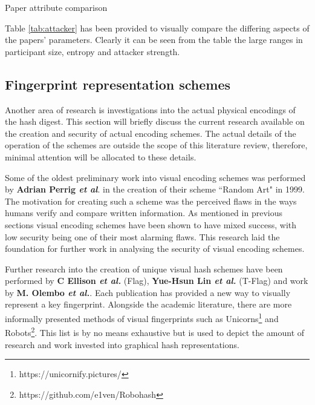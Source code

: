 \begin{table}[h!]
    \makebox[\textwidth][c]{
        
    }%
    \caption{Paper attribute comparison}
    \label{tab:attacker}
\end{table}

Table \ref{tab:attacker} has been provided to visually compare the differing aspects of the papers' parameters. Clearly it can be seen from the table the large ranges in participant size, entropy and attacker strength.

\subsection{Fingerprint representation schemes}
Another area of research is investigations into the actual physical encodings of the hash digest. This section will briefly discuss the current research available on the creation and security of actual encoding schemes. The actual details of the operation of the schemes are outside the scope of this literature review, therefore, minimal attention will be allocated to these details.

Some of the oldest preliminary work into visual encoding schemes was performed by \textbf{Adrian Perrig \textit{et al}}\cite{perrig1999hash}. in the creation of their scheme ``Random Art" in 1999. The motivation for creating such a scheme was the perceived flaws in the ways humans verify and compare written information. As mentioned in previous sections visual encoding schemes have been shown to have mixed success, with low security being one of their most alarming flaws. This research laid the foundation for further work in analysing the security of visual encoding schemes.

Further research into the creation of unique visual hash schemes have been performed by \textbf{C Ellison \textit{et al.}} \cite{ellison2003public} (Flag), \textbf{Yue-Hsun Lin \textit{et al.}}\cite{lin2010spate} (T-Flag) and work by \textbf{M.  Olembo \textit{et al.}}\cite{olembo2013developing}. Each publication has provided a new way to visually represent a key fingerprint. Alongside the academic literature, there are more informally presented methods of visual fingerprints such as Unicorns\footnote{https://unicornify.pictures/} and Robots\footnote{https://github.com/e1ven/Robohash}. This list is by no means exhaustive but is used to depict the amount of research and work invested into graphical hash representations.

